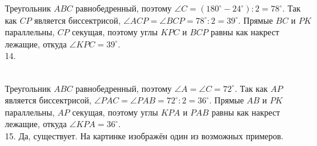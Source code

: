 \documentclass[12pt]{article}
\begin{document}
Треугольник $ABC$ равнобедренный, поэтому $\angle C=(180^\circ-24^\circ):2=78^\circ.$ Так как $CP$ является биссектрисой, $\angle ACP=\angle BCP=78^\circ:2=39^\circ.$ Прямые $BC$ и $PK$ параллельны, $CP$ секущая, поэтому углы $KPC$ и $BCP$ равны как накрест лежащие, откуда $\angle KPC=39^\circ.$\\
14. \begin{figure}[ht!]
\end{figure}\\
Треугольник $ABC$ равнобедренный, поэтому $\angle A=\angle C =72^\circ.$ Так как $AP$ является биссектрисой, $\angle PAC=\angle PAB=72^\circ:2=36^\circ.$ Прямые $AB$ и $PK$ параллельны, $AP$ секущая, поэтому углы $KPA$ и $PAB$ равны как накрест лежащие, откуда $\angle KPA=36^\circ.$\\
15. Да, существует. На картинке изображён один из возможных примеров.
\end{document}
